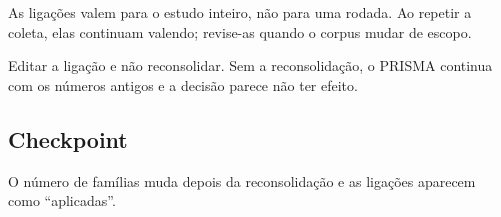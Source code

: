 \begin{nota}
As ligações valem para o estudo inteiro, não para uma rodada. Ao repetir a coleta, elas continuam
valendo; revise-as quando o corpus mudar de escopo.
\end{nota}

\begin{alerta}
Editar a ligação e não reconsolidar. Sem a reconsolidação, o PRISMA continua com os números antigos e
a decisão parece não ter efeito.
\end{alerta}

\subsection*{Checkpoint}
\marcador\; O número de famílias muda depois da reconsolidação e as ligações aparecem como ``aplicadas''.
